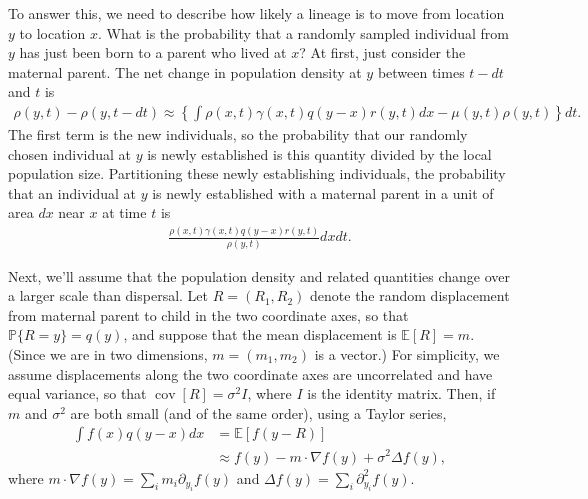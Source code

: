 \documentclass{article}
\renewcommand{\P}{\mathbb{P}}
\newcommand{\E}{\mathbb{E}}
\DeclareMathOperator{\cov}{cov}
\newcommand{\grad}{\nabla}
\newcommand{\details}[1]{\relax}
\begin{document}
To answer this, we need to describe how likely a lineage is to move from location $y$ to location $x$.
What is the probability that a randomly sampled individual from $y$
has just been born to a parent who lived at $x$?
At first, just consider the maternal parent.
The net change in population density at $y$ between times $t - dt$ and $t$ is
\begin{align*}
    \rho(y, t) - \rho(y, t - dt)
    \approx
    \left\{
        \int \rho(x, t) \gamma(x, t) q(y - x) r(y, t) dx - \mu(y, t) \rho(y, t) 
    \right\} dt .
\end{align*}
The first term is the new individuals,
so the probability that our randomly chosen individual at $y$ is newly established is
this quantity divided by the local population size.
Partitioning these newly establishing individuals,
the probability that an individual at $y$ is newly established
with a maternal parent in a unit of area $dx$ near $x$ at time $t$ is
\begin{align} \label{eqn:jump_intro}
    \frac{
        \rho(x, t) \gamma(x, t) q(y - x) r(y, t)
    }{ \rho(y, t) } dx dt .
\end{align}

Next, we'll assume that the population density and related quantities
change over a larger scale than dispersal.
Let $R = (R_1, R_2)$ denote the random displacement from maternal parent to child
in the two coordinate axes,
so that $\P\{R = y\} = q(y)$,
and suppose that the mean displacement is $\E[R] = m$.
(Since we are in two dimensions, $m = (m_1, m_2)$ is a vector.)
For simplicity, we assume displacements along the two coordinate axes 
are uncorrelated and have equal variance,
so that $\cov[R] = \sigma^2 I$, where $I$ is the identity matrix.
Then, if $m$ and $\sigma^2$ are both small (and of the same order),
using a Taylor series,
\begin{align} \label{eqn:taylor}
    \int f(x) q(y - x) dx %
    &= \E[f(y - R)] \\  %
    &\approx f(y) - m \cdot \grad f(y) + \sigma^2 \Delta f(y) ,
\end{align}
where $m \cdot \grad f(y) = \sum_i m_i \partial_{y_i} f(y)$
and $\Delta f(y) = \sum_i \partial^2_{y_i} f(y)$.
\details{(There is also a term $\sum_{ij} m_i m_j \partial_{ij} f(y)$, but it is second-order in $m$.)}
\end{document}
